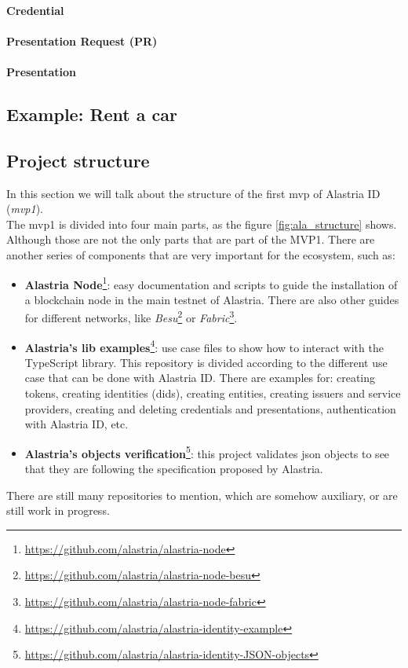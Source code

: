 \documentclass[a4paper, 12pt]{article} %
\begin{document}
            \paragraph{Credential}
            
            \paragraph{Presentation Request (PR)}
            
            \paragraph{Presentation}
        
    \subsection{Example: Rent a car}
        
    \subsection{Project structure}
        In this section we will talk about the structure of the first \acrlong{mvp} of Alastria ID (\textit{\acrshort{mvp}1})\cite{ala-mvp1}.\\
        
        The \acrshort{mvp}1 is divided into four main parts, as the figure \ref{fig:ala_structure} shows. Although those are not the only parts that are part of the MVP1. There are another series of components that are very important for the ecosystem, such as:
        \begin{itemize}
            \item \textbf{Alastria Node}\footnote{\url{https://github.com/alastria/alastria-node}}: easy documentation and scripts to guide the installation of a blockchain node in the main testnet of Alastria. There are also other guides for different networks, like \textit{Besu}\footnote{\url{https://github.com/alastria/alastria-node-besu}} or \textit{Fabric}\footnote{\url{https://github.com/alastria/alastria-node-fabric}}.
            \item \textbf{Alastria's lib examples}\footnote{\url{https://github.com/alastria/alastria-identity-example}}: use case files to show how to interact with the TypeScript library. This repository is divided according to the different use case that can be done with Alastria ID. There are examples for: creating tokens, creating identities (\acrshort{dids}), creating entities, creating issuers and service providers, creating and deleting credentials and presentations, authentication with Alastria ID, etc.
            \item \textbf{Alastria's objects verification}\footnote{\url{https://github.com/alastria/alastria-identity-JSON-objects}}: this project validates \acrshort{json} objects to see that they are following the specification proposed by Alastria.
        \end{itemize}
        There are still many repositories to mention, which are somehow auxiliary, or are still work in progress.
        
\end{document}

